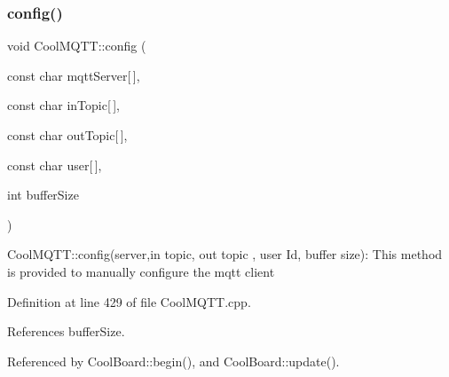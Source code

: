 \subsubsection{\texorpdfstring{config()}{config()}\hspace{0.1cm}{\footnotesize\ttfamily [1/2]}}
{\footnotesize\ttfamily void Cool\+M\+Q\+T\+T\+::config (\begin{DoxyParamCaption}\item[{const char}]{mqtt\+Server\mbox{[}$\,$\mbox{]},  }\item[{const char}]{in\+Topic\mbox{[}$\,$\mbox{]},  }\item[{const char}]{out\+Topic\mbox{[}$\,$\mbox{]},  }\item[{const char}]{user\mbox{[}$\,$\mbox{]},  }\item[{int}]{buffer\+Size }\end{DoxyParamCaption})}

Cool\+M\+Q\+T\+T\+::config(server,in topic, out topic , user Id, buffer size)\+: This method is provided to manually configure the mqtt client 

Definition at line 429 of file Cool\+M\+Q\+T\+T.\+cpp.



References buffer\+Size.



Referenced by Cool\+Board\+::begin(), and Cool\+Board\+::update().


